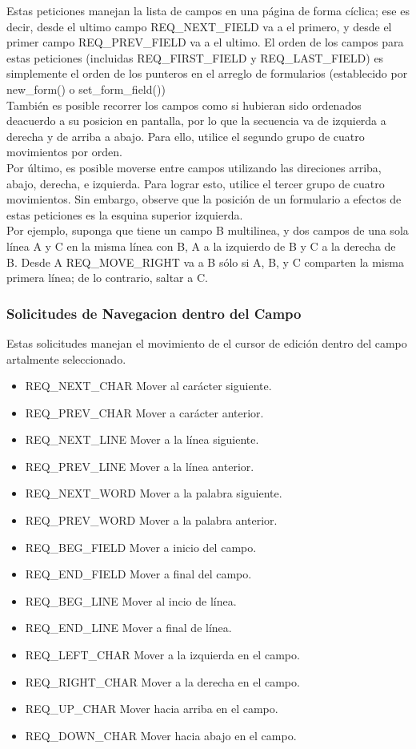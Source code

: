 \documentclass{article}
\begin{document}
Estas peticiones manejan la lista de campos en una página de forma cíclica; ese
es decir, desde el ultimo campo REQ\_NEXT\_FIELD va a el primero, y desde el
primer campo REQ\_PREV\_FIELD va a el ultimo. El orden de los campos para estas
peticiones (incluidas REQ\_FIRST\_FIELD y REQ\_LAST\_FIELD) es simplemente el orden
de los punteros en el arreglo de formularios (establecido por new\_form() o
set\_form\_field())\\

También es posible recorrer los campos como si hubieran sido ordenados
deacuerdo a su posicion en pantalla, por lo que la secuencia va de izquierda a
derecha y de arriba a abajo. Para ello, utilice el segundo grupo de cuatro
movimientos por orden.\\

Por último, es posible moverse entre campos utilizando las direciones arriba,
abajo, derecha, e izquierda. Para lograr esto, utilice el tercer grupo de
cuatro movimientos. Sin embargo, observe que la posición de un formulario a
efectos de estas peticiones es la esquina superior izquierda.\\

Por ejemplo, suponga que tiene un campo B multilinea, y dos campos de una sola
línea A y C en la misma línea con B, A a la izquierdo de B y C a la derecha de
B. Desde A REQ\_MOVE\_RIGHT va a B sólo si A, B, y C comparten la misma primera
línea; de lo contrario, saltar a C.

\subsubsection{Solicitudes de Navegacion dentro del Campo}%
Estas solicitudes manejan el movimiento de el cursor de edición dentro del
campo artalmente seleccionado.

\begin{itemize}
  \item REQ\_NEXT\_CHAR Mover al carácter siguiente.
  \item REQ\_PREV\_CHAR Mover a carácter anterior.
  \item REQ\_NEXT\_LINE Mover a la línea siguiente.
  \item REQ\_PREV\_LINE Mover a la línea anterior.
  \item REQ\_NEXT\_WORD Mover a la palabra siguiente.
  \item REQ\_PREV\_WORD Mover a la palabra anterior.
  \item REQ\_BEG\_FIELD Mover a inicio del campo.
  \item REQ\_END\_FIELD Mover a final del campo.
  \item REQ\_BEG\_LINE Mover al incio de línea.
  \item REQ\_END\_LINE Mover a final de línea.
  \item REQ\_LEFT\_CHAR Mover a la izquierda en el campo.
  \item REQ\_RIGHT\_CHAR Mover a la derecha en el campo.
  \item REQ\_UP\_CHAR Mover hacia arriba en el campo.
  \item REQ\_DOWN\_CHAR Mover hacia abajo en el campo.
\end{itemize}
\end{document}
